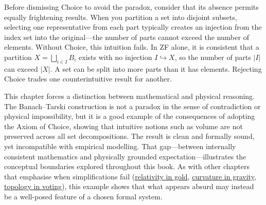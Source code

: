 Before dismissing Choice to avoid the paradox, consider that its absence permits equally frightening results. When you partition a set into disjoint subsets, selecting one representative from each part typically creates an injection from the index set into the original—the number of parts cannot exceed the number of elements. Without Choice, this intuition fails. In ZF alone, it is consistent that a partition $X = \bigsqcup_{i \in I} B_i$ exists with no injection $I \hookrightarrow X$, so the number of parts $|I|$ can exceed $|X|$. A set can be split into more parts than it has elements. Rejecting Choice trades one counterintuitive result for another. 

\begin{commentary}
This chapter forces a distinction between mathematical and physical reasoning. The Banach–Tarski construction is not a paradox in the sense of contradiction or physical impossibility, but it is a good example of the consequences of adopting the Axiom of Choice, showing that intuitive notions such as volume are not preserved across all set decompositions. The result is clean and formally sound, yet incompatible with empirical modelling. That gap—between internally consistent mathematics and physically grounded expectation—illustrates the conceptual boundaries explored throughout this book. As with other chapters that emphasise when simplifications fail (\hyperref[ch:goldrelativity]{relativity in gold}, \hyperref[ch:gravitytimedilation]{curvature in gravity}, \hyperref[ch:arrowtheoremtopology]{topology in voting}), this example shows that what appears absurd may instead be a well-posed feature of a chosen formal system.

\end{commentary}

